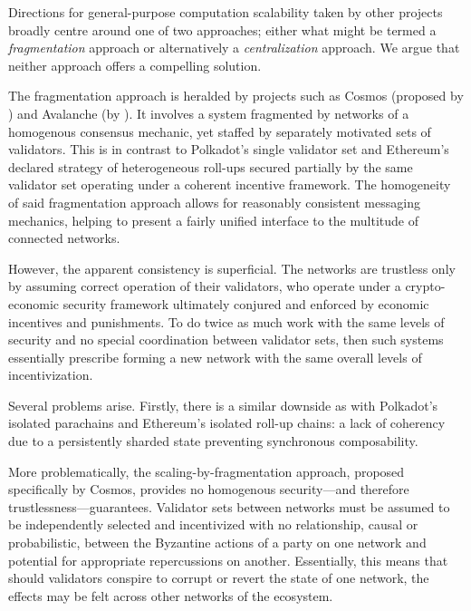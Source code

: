 Directions for general-purpose computation scalability taken by other projects broadly centre around one of two approaches; either what might be termed a \emph{fragmentation} approach or alternatively a \emph{centralization} approach. We argue that neither approach offers a compelling solution.

The fragmentation approach is heralded by projects such as Cosmos (proposed by \cite{kwon2019cosmos}) and Avalanche (by \cite{tanana2019avalanche}). It involves a system fragmented by networks of a homogenous consensus mechanic, yet staffed by separately motivated sets of validators. This is in contrast to Polkadot's single validator set and Ethereum's declared strategy of heterogeneous roll-ups secured partially by the same validator set operating under a coherent incentive framework. The homogeneity of said fragmentation approach allows for reasonably consistent messaging mechanics, helping to present a fairly unified interface to the multitude of connected networks.

However, the apparent consistency is superficial. The networks are trustless only by assuming correct operation of their validators, who operate under a crypto-economic security framework ultimately conjured and enforced by economic incentives and punishments. To do twice as much work with the same levels of security and no special coordination between validator sets, then such systems essentially prescribe forming a new network with the same overall levels of incentivization.

Several problems arise. Firstly, there is a similar downside as with Polkadot's isolated parachains and Ethereum's isolated roll-up chains: a lack of coherency due to a persistently sharded state preventing synchronous composability.

More problematically, the scaling-by-fragmentation approach, proposed specifically by Cosmos, provides no homogenous security---and therefore trustlessness---guarantees. Validator sets between networks must be assumed to be independently selected and incentivized with no relationship, causal or probabilistic, between the Byzantine actions of a party on one network and potential for appropriate repercussions on another. Essentially, this means that should validators conspire to corrupt or revert the state of one network, the effects may be felt across other networks of the ecosystem.

